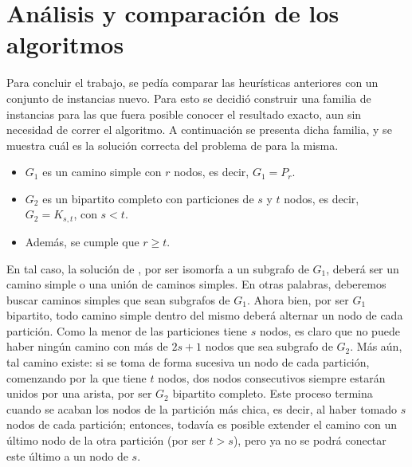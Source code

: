 \section{Análisis y comparación de los algoritmos}


Para concluir el trabajo, se pedía comparar las heurísticas anteriores con
un conjunto de instancias nuevo. Para esto se decidió construir una familia
de instancias para las que fuera posible conocer el resultado exacto, aun
sin necesidad de correr el algoritmo. A continuación se presenta dicha
familia, y se muestra cuál es la solución correcta del problema de 
para la misma.

\begin{itemize}
    \item $G_1$ es un camino simple con $r$ nodos, es decir, $G_1 = P_r$.
    \item $G_2$ es un bipartito completo con particiones de $s$ y $t$ nodos,
    es decir, $G_2 = K_{s,t}$, con $s < t$.
    \item Además, se cumple que $r \geq t$.
\end{itemize}

En tal caso, la solución de , por ser isomorfa a un subgrafo de
$G_1$, deberá ser un camino simple o una unión de caminos simples. En otras
palabras, deberemos buscar caminos simples que sean subgrafos de $G_1$. Ahora
bien, por ser $G_1$ bipartito, todo camino simple dentro del mismo deberá
alternar un nodo de cada partición. Como la menor de las particiones tiene $s$
nodos, es claro que no puede haber ningún camino con más de $2s + 1$ nodos que
sea subgrafo de $G_2$. Más aún, tal camino existe: si se toma de forma
sucesiva un nodo de cada partición, comenzando por la que tiene $t$ nodos, dos
nodos consecutivos siempre estarán unidos por una arista, por ser $G_2$
bipartito completo. Este proceso termina cuando se acaban los nodos de la
partición más chica, es decir, al haber tomado $s$ nodos de cada partición;
entonces, todavía es posible extender el camino con un último nodo de la otra
partición (por ser $t > s$), pero ya no se podrá conectar este último a un
nodo de $s$.

